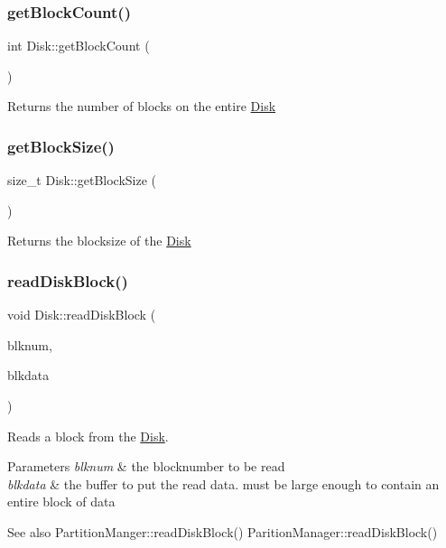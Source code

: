\subsubsection{\texorpdfstring{get\+Block\+Count()}{getBlockCount()}}
{\footnotesize\ttfamily int Disk\+::get\+Block\+Count (\begin{DoxyParamCaption}{ }\end{DoxyParamCaption})}

\begin{DoxyReturn}{Returns}
the number of blocks on the entire \mbox{\hyperlink{class_disk}{Disk}} 
\end{DoxyReturn}
\mbox{\label{class_disk_a1c149b57524fe4e7ae7c8643309e0501}} 
\subsubsection{\texorpdfstring{get\+Block\+Size()}{getBlockSize()}}
{\footnotesize\ttfamily size\+\_\+t Disk\+::get\+Block\+Size (\begin{DoxyParamCaption}{ }\end{DoxyParamCaption})}

\begin{DoxyReturn}{Returns}
the blocksize of the \mbox{\hyperlink{class_disk}{Disk}} 
\end{DoxyReturn}
\mbox{\label{class_disk_a2598cdd9013bdbb1213afa878c567daa}} 
\subsubsection{\texorpdfstring{read\+Disk\+Block()}{readDiskBlock()}}
{\footnotesize\ttfamily void Disk\+::read\+Disk\+Block (\begin{DoxyParamCaption}\item[{Blk\+Num\+Type}]{blknum,  }\item[{char $\ast$}]{blkdata }\end{DoxyParamCaption})}

Reads a block from the \mbox{\hyperlink{class_disk}{Disk}}. 
\begin{DoxyParams}{Parameters}
{\em blknum} & the blocknumber to be read \\
\hline
{\em blkdata} & the buffer to put the read data. must be large enough to contain an entire block of data \\
\hline
\end{DoxyParams}
\begin{DoxySeeAlso}{See also}
Partition\+Manger\+::read\+Disk\+Block() Parition\+Manager\+::read\+Disk\+Block() 
\end{DoxySeeAlso}
\mbox{\label{class_disk_a5d335138f56e6b87c8ebc4b6473183e7}} 
